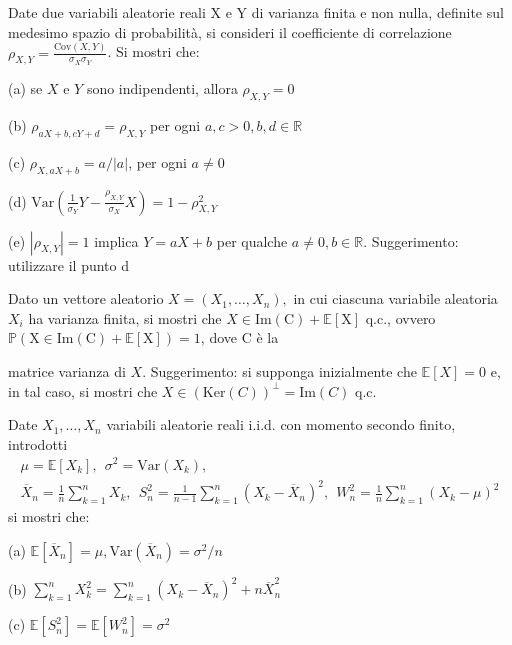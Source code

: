 
\ParteEsercizi

\Esercizio{}

Date due variabili aleatorie reali X e Y di varianza finita e non nulla, definite sul medesimo spazio di probabilità, si consideri il coefficiente di correlazione $\rho _{X,Y} =\frac{\mathrm{Cov} (X,Y)}{\sigma _{X} \sigma _{Y}}$. Si mostri che:

(a) se $X$ e $Y$ sono indipendenti, allora $\rho _{X,Y} =0$

(b) $\rho _{aX+b,cY+d} =\rho _{X,Y}$ per ogni $a,c >0,b,d\in \mathbb{R}$

(c) $\rho _{X,aX+b} =a/|a|$, per ogni $a\neq 0$

(d) $\mathrm{Var}\left(\frac{1}{\sigma _{Y}} Y-\frac{\rho _{X,Y}}{\sigma _{X}} X\right) =1-\rho _{X,Y}^{2}$

(e) $| \rho _{X,Y}| =1$ implica $Y=aX+b$ per qualche $a\neq 0,b\in \mathbb{R}$. Suggerimento: utilizzare il punto d
\Esercizio{$\star$}

Dato un vettore aleatorio $X=( X_{1} ,\dotsc ,X_{n}) ,$ in cui ciascuna variabile aleatoria $X_{i}$ ha varianza finita, si mostri che $X\in \mathrm{Im} (\mathrm{C} )+\mathbb{E} [\mathrm{X} ]$ q.c., ovvero $\mathbb{P} (\mathrm{X} \in \mathrm{Im} (\mathrm{C} )+\mathbb{E} [\mathrm{X} ])=1$, dove $\mathrm{C}$ è la

matrice varianza di $X$. Suggerimento: si supponga inizialmente che $\mathbb{E} [X]=0$ e, in tal caso, si mostri che $X\in (\mathrm{Ker} (C))^{\perp } =\mathrm{Im} (C)$ q.c.
\Esercizio{}

Date $X_{1} ,\dotsc ,X_{n}$ variabili aleatorie reali i.i.d. con momento secondo finito, introdotti
\begin{gather*}
\mu =\mathbb{E}[ X_{k}] ,\ \ \sigma ^{2} =\mathrm{Var}( X_{k}) ,\\
\overline{X}_{n} =\frac{1}{n}\sum _{k=1}^{n} X_{k} ,\ \ S_{n}^{2} =\frac{1}{n-1}\sum _{k=1}^{n}( X_{k} -\overline{X}_{n})^{2} ,\ \ W_{n}^{2} =\frac{1}{n}\sum _{k=1}^{n}( X_{k} -\mu )^{2}
\end{gather*}
si mostri che:

(a) $\mathbb{E}[\overline{X}_{n}] =\mu ,\mathrm{Var}(\overline{X}_{n}) =\sigma ^{2} /n$

(b) $\sum _{k=1}^{n} X_{k}^{2} =\sum _{k=1}^{n}( X_{k} -\overline{X}_{n})^{2} +n\overline{X}_{n}^{2}$

(c) $\mathbb{E}\left[ S_{n}^{2}\right] =\mathbb{E}\left[ W_{n}^{2}\right] =\sigma ^{2}$
\Esercizio{}

